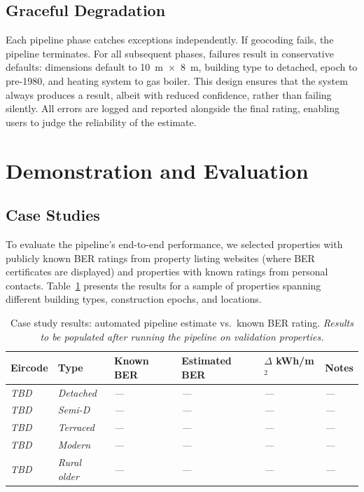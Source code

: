 \documentclass[preprint,12pt,authoryear]{elsarticle}
\begin{document}
\subsection{Graceful Degradation}

Each pipeline phase catches exceptions independently. If geocoding fails, the pipeline terminates. For all subsequent phases, failures result in conservative defaults: dimensions default to \SI{10}{\metre}~$\times$~\SI{8}{\metre}, building type to detached, epoch to pre-1980, and heating system to gas boiler. This design ensures that the system always produces a result, albeit with reduced confidence, rather than failing silently. All errors are logged and reported alongside the final rating, enabling users to judge the reliability of the estimate.

\section{Demonstration and Evaluation}
\label{sec:evaluation}

\subsection{Case Studies}

To evaluate the pipeline's end-to-end performance, we selected properties with publicly known BER ratings from property listing websites (where BER certificates are displayed) and properties with known ratings from personal contacts. Table~\ref{tab:case_studies} presents the results for a sample of properties spanning different building types, construction epochs, and locations.

\begin{table}[htbp]
\centering
\caption{Case study results: automated pipeline estimate vs.\ known BER rating. \emph{Results to be populated after running the pipeline on validation properties.}}
\label{tab:case_studies}
\begin{tabular}{@{}llllll@{}}
\toprule
Eircode & Type & Known BER & Estimated BER & $\Delta$ kWh/m$^2$ & Notes \\
\midrule
\emph{TBD} & \emph{Detached}    & \emph{---} & \emph{---} & \emph{---} & \emph{---} \\
\emph{TBD} & \emph{Semi-D}      & \emph{---} & \emph{---} & \emph{---} & \emph{---} \\
\emph{TBD} & \emph{Terraced}    & \emph{---} & \emph{---} & \emph{---} & \emph{---} \\
\emph{TBD} & \emph{Modern}      & \emph{---} & \emph{---} & \emph{---} & \emph{---} \\
\emph{TBD} & \emph{Rural older}  & \emph{---} & \emph{---} & \emph{---} & \emph{---} \\
\bottomrule
\end{tabular}
\end{table}
\end{document}
